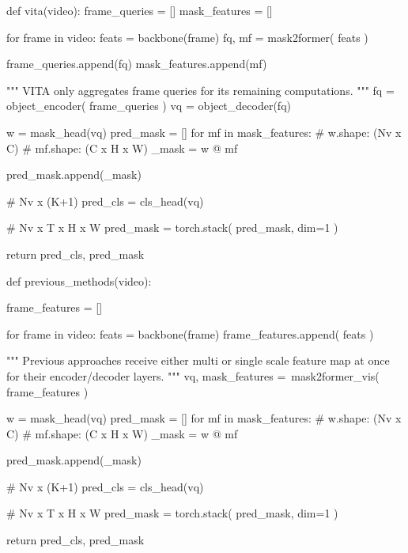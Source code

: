 \documentclass{article}
\begin{document}
\begin{table}[H]
	\centering
	\begin{minipage}[t]{0.49\linewidth}
    \caption{
PyTorch-style inference pseudo-code of VITA.
}
    \label{alg:vita}
    \begin{python}
def vita(video):
    frame_queries = []
    mask_features = []

    for frame in video:
        feats = backbone(frame)
        fq, mf = mask2former(
            feats
        )

        frame_queries.append(fq)
        mask_features.append(mf)

    """
    VITA only aggregates
    frame queries for its
    remaining computations.
    """
    fq = object_encoder(
        frame_queries
    )
    vq = object_decoder(fq)

    w = mask_head(vq)
    pred_mask = []
    for mf in mask_features:
        # w.shape: (Nv x C)
        # mf.shape: (C x H x W)
        _mask = w @ mf

        pred_mask.append(_mask)

    # Nv x (K+1)
    pred_cls = cls_head(vq)

    # Nv x T x H x W
    pred_mask = torch.stack(
        pred_mask, dim=1
    )

    return pred_cls, pred_mask
    \end{python}
\end{minipage}
	\hfill
	\begin{minipage}[t]{0.49\linewidth}
    \caption{
PyTorch-style inference pseudo-code of Mask2Former-VIS~\cite{Mask2Former-VIS}.
}
    \label{alg:mask2former}
    \begin{python}
def previous_methods(video):

    frame_features = []

    for frame in video:
        feats = backbone(frame)
        frame_features.append(
            feats
        )

    """
    Previous approaches receive
    either multi or single scale
    feature map at once for their
    encoder/decoder layers.
    """
    vq, mask_features =\
        mask2former_vis(
            frame_features
        )



    w = mask_head(vq)
    pred_mask = []
    for mf in mask_features:
        # w.shape: (Nv x C)
        # mf.shape: (C x H x W)
        _mask = w @ mf

        pred_mask.append(_mask)

    # Nv x (K+1)
    pred_cls = cls_head(vq)

    # Nv x T x H x W
    pred_mask = torch.stack(
        pred_mask, dim=1
    )

    return pred_cls, pred_mask
    \end{python}
\end{minipage}
\end{table}
 

 
\end{document}
